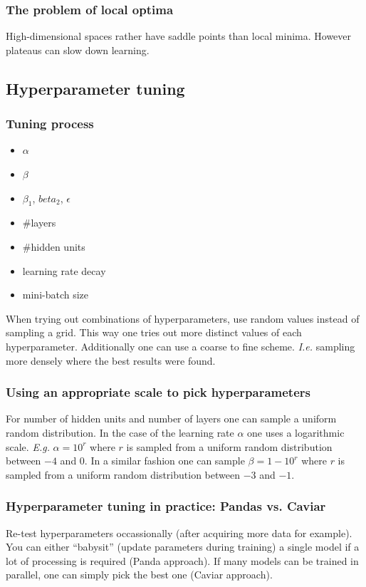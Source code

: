 \documentclass{article}
\begin{document}
\subsubsection{The problem of local optima}
High-dimensional spaces rather have saddle points than local minima.
However plateaus can slow down learning.

\subsection{Hyperparameter tuning}
\subsubsection{Tuning process}
\begin{itemize}
  \item $\alpha$
  \item $\beta$
  \item $\beta_1$, $beta_2$, $\epsilon$
  \item \#layers
  \item \#hidden units
  \item learning rate decay
  \item mini-batch size
\end{itemize}
When trying out combinations of hyperparameters, use random values instead of sampling a grid.
This way one tries out more distinct values of each hyperparameter.
Additionally one can use a coarse to fine scheme. \emph{I.e.} sampling more densely where the best results were found.

\subsubsection{Using an appropriate scale to pick hyperparameters}
For number of hidden units and number of layers one can sample a uniform random distribution.
In the case of the learning rate $\alpha$ one uses a logarithmic scale.
\emph{E.g.} $\alpha=10^r$ where $r$ is sampled from a uniform random distribution between $-4$ and $0$.
In a similar fashion one can sample $\beta=1-10^r$ where $r$ is sampled from a uniform random distribution between $-3$ and $-1$.

\subsubsection{Hyperparameter tuning in practice: Pandas vs. Caviar}
Re-test hyperparameters occassionally (after acquiring more data for example).
You can either ``babysit'' (update parameters during training) a single model if a lot of processing is required (Panda approach).
If many models can be trained in parallel, one can simply pick the best one (Caviar approach).
\end{document}
